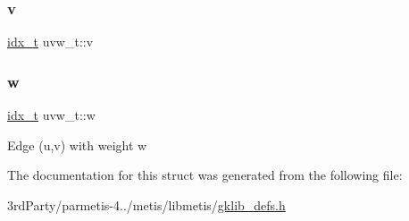\subsubsection{\texorpdfstring{v}{v}}
{\footnotesize\ttfamily \hyperlink{3rd_party_2parmetis-4_80_83_2metis_2include_2metis_8h_aaa5262be3e700770163401acb0150f52}{idx\+\_\+t} uvw\+\_\+t\+::v}

\mbox{\label{structuvw__t_ad8b9f1185850e05876ee066a461c0d9d}} 
\subsubsection{\texorpdfstring{w}{w}}
{\footnotesize\ttfamily \hyperlink{3rd_party_2parmetis-4_80_83_2metis_2include_2metis_8h_aaa5262be3e700770163401acb0150f52}{idx\+\_\+t} uvw\+\_\+t\+::w}

Edge (u,v) with weight w 

The documentation for this struct was generated from the following file\+:\begin{DoxyCompactItemize}
\item 
3rd\+Party/parmetis-\/4../metis/libmetis/\hyperlink{gklib__defs_8h}{gklib\+\_\+defs.\+h}\end{DoxyCompactItemize}
